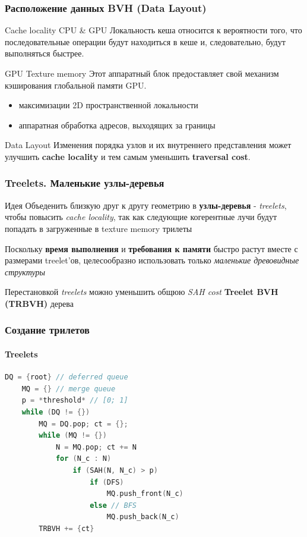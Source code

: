 \documentclass{beamer}
\begin{document}
\begin{frame}
    \frametitle{Расположение данных BVH (Data Layout)}
    \begin{block}{Cache locality CPU \& GPU}
        Локальность кеша относится к вероятности того,
        что последовательные операции будут находиться в кеше и,
        следовательно, будут выполняться быстрее.
    \end{block}
    \begin{block}{GPU Texture memory}
        Этот аппаратный блок предоставляет свой механизм кэширования глобальной памяти GPU.
        \begin{itemize}
            \item
                максимизации 2D пространственной локальности
            \item
                аппаратная обработка адресов, выходящих за границы
        \end{itemize}
    \end{block}
    \begin{block}{Data Layout}
        Изменения порядка узлов и их внутреннего представления может улучшить \textbf{cache locality}
        и тем самым уменьшить \textbf{traversal cost}.
    \end{block}
\end{frame}

\begin{frame}[t]
    \frametitle{Treelets. Маленькие узлы-деревья}

    \begin{block}{Идея}
        Объеденить близкую друг к другу геометрию в \textbf{узлы-деревья} - \textit{treelets}, чтобы повысить
        \textit{cache locality}, так как следующие когерентные лучи будут попадать в загруженные в texture memory трилеты
    \end{block}
    \begin{block}{}
        Поскольку \textbf{время выполнения} и \textbf{требования к памяти} быстро растут вместе с размерами treelet'ов,
        целесообразно использовать только \textit{маленькие древовидные структуры}
    \end{block}
    Перестановкой \textit{treelets} можно уменьшить общюю \textit{SAH cost} \textbf{Treelet BVH (TRBVH)} дерева
\end{frame}

\begin{frame}[fragile]
    \frametitle{Создание трилетов}
    \framesubtitle{Treelets}
    \begin{lstlisting}[language=C++,basicstyle=\ttfamily,keywordstyle=\color{blue}]
    DQ = {root} // deferred queue
    MQ = {} // merge queue
    p = *threshold* // [0; 1]
    while (DQ != {})
        MQ = DQ.pop; ct = {};
        while (MQ != {})
            N = MQ.pop; ct += N
            for (N_c : N)
                if (SAH(N, N_c) > p)
                    if (DFS)
                        MQ.push_front(N_c)
                    else // BFS
                        MQ.push_back(N_c)
        TRBVH += {ct}
    \end{lstlisting}
\end{frame}
\end{document}
